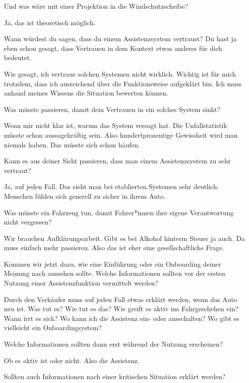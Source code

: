 \interviewerin
Und was wäre mit einer Projektion in die Windschutzscheibe?

Ja, das ist theoretisch möglich.

\interviewerin
Wann würdest du sagen, dass du einem Assistenzsystem vertraust? Du hast
ja eben schon gesagt, dass Vertrauen in dem Kontext etwas anderes für
dich bedeutet.

Wie gesagt, ich vertraue solchen Systemen nicht wirklich. Wichtig ist
für mich trotzdem, dass ich ausreichend über die Funktionsweise
aufgeklärt bin. Ich muss anhand meines Wissens die Situation bewerten
können.

\interviewerin
Was müsste passieren, damit dein Vertrauen in ein solches System sinkt?

Wenn mir nicht klar ist, warum das System versagt hat. Die
Unfallstatistik müsste schon aussagekräftig sein. Also hundertprozentige
Gewissheit wird man niemals haben. Das müsste sich schon häufen.

\interviewerin
Kann es aus deiner Sicht passieren, dass man einem Assistenzsystem zu
sehr vertraut?

Ja, auf jeden Fall. Das sieht man bei etablierten Systemen sehr
deutlich. Menschen fühlen sich generell zu sicher in ihrem Auto.

\interviewerin
Was müsste ein Fahrzeug tun, damit Fahrer*innen ihre eigene
Verantwortung nicht vergessen?

Wir brauchen Aufklärungsarbeit. Gibt es bei Alkohol hinterm Steuer ja
auch. Da muss einfach mehr passieren. Also das ist eher eine
gesellschaftliche Frage.

\interviewerin
Kommen wir jetzt dazu, wie eine Einführung oder ein Onboarding deiner
Meinung nach aussehen sollte. Welche Informationen sollten vor der
ersten Nutzung einer Assistenzfunktion vermittelt werden?

Durch den Verkäufer muss auf jeden Fall etwas erklärt werden, wenn das
Auto neu ist. Was tut es? Wie tut es das? Wie greift es aktiv ins
Fahrgeschehen ein? Wann irrt es sich? Wo kann ich die Assistenz ein-
oder ausschalten? Wo gibt es vielleicht ein Onboardingsystem?

\interviewerin
Welche Informationen sollten dann erst während der Nutzung erscheinen?

Ob es aktiv ist oder nicht. Also die Assistenz.

\interviewerin
Sollten auch Informationen nach einer kritischen Situation erklärt
werden?

